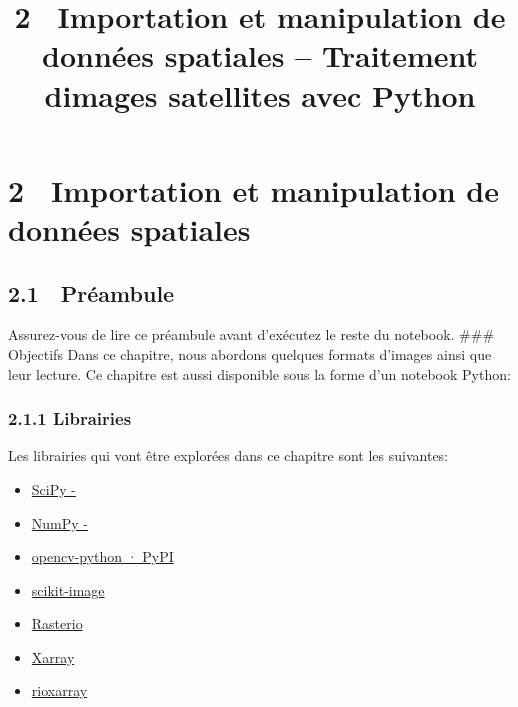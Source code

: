 \documentclass[
]{article}
\title{2~ Importation et manipulation de données spatiales -- Traitement
d\textquotesingle images satellites avec Python}
\author{}
\date{}
\makeatletter
\newcommand*\pandocbounded[1]{%
  \sbox\pandoc@box{#1}%
  \Gscale@div\@tempa{\textheight}{\dimexpr\ht\pandoc@box+\dp\pandoc@box\relax}%
  \Gscale@div\@tempb{\linewidth}{\wd\pandoc@box}%
  \ifdim\@tempb\p@<\@tempa\p@\let\@tempa\@tempb\fi%
  \ifdim\@tempa\p@<\p@\scalebox{\@tempa}{\usebox\pandoc@box}%
  \else\usebox{\pandoc@box}%
  \fi%
}
\makeatother
\begin{document}
\maketitle

\label{quarto-document-content}
\label{title-block-header}
\section{\texorpdfstring{\protect\hypertarget{sec-chap01}{}{{2}~
{Importation et manipulation de données
spatiales}}}{2~ Importation et manipulation de données spatiales}}\label{importation-et-manipulation-de-donnuxe9es-spatiales}

\subsection{\texorpdfstring{{2.1} {🚀}
Préambule}{2.1 🚀 Préambule}}\label{pruxe9ambule}

Assurez-vous de lire ce préambule avant d'exécutez le reste du notebook.
\#\#\# {🎯} Objectifs Dans ce chapitre, nous abordons quelques formats
d'images ainsi que leur lecture. Ce chapitre est aussi disponible sous
la forme d'un notebook Python:

\href{https://colab.research.google.com/github/sfoucher/TraitementImagesPythonVol1/blob/main/notebooks/01-ImportationManipulationImages.ipynb}{\pandocbounded{}}

\subsubsection{\texorpdfstring{{2.1.1}
Librairies}{2.1.1 Librairies}}\label{librairies}

Les librairies qui vont être explorées dans ce chapitre sont les
suivantes:

\begin{itemize}
\item
  \href{https://scipy.org/}{SciPy -}
\item
  \href{https://numpy.org/}{NumPy -}
\item
  \href{https://pypi.org/project/opencv-python/}{opencv-python · PyPI}
\item
  \href{https://scikit-image.org/}{scikit-image}
\item
  \href{https://rasterio.readthedocs.io/en/stable/}{Rasterio}
\item
  \href{https://docs.xarray.dev/en/stable/}{Xarray}
\item
  \href{https://corteva.github.io/rioxarray/stable/index.html}{rioxarray}
\end{itemize}
\end{document}
